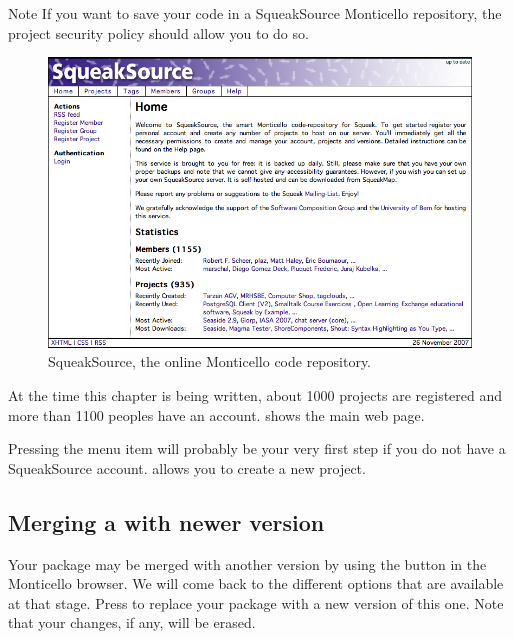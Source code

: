 \documentclass[a4paper,10pt,twoside]{book}
\begin{document}
Note If you want to save your code in a SqueakSource Monticello repository, the project security policy should allow you to do so.


\begin{figure}[ht]\centering
	\includegraphics[width=.75\linewidth]{squeaksource2}
	\caption{SqueakSource, the online Monticello code repository.}
\end{figure}

At the time this chapter is being written, about 1000 projects are registered and more than 1100 peoples have an account.  shows the main web page.

Pressing the  menu item will probably be your very first step if you do not have a SqueakSource account.  allows you to create a new project. 

\subsection{Merging a with newer version}

Your package may be merged with another version by using the  button in the Monticello browser. We will come back to the different options that are available at that stage. Press  to replace your package with a new version of this one. Note that your changes, if any, will be erased.
\end{document}
